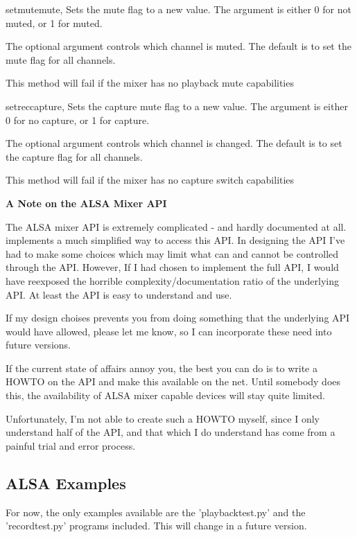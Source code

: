 \begin{methoddesc}[Mixer]{setmute}{mute, }
Sets the mute flag to a new value. The  argument is either 0 for not muted, or 1 for muted.

The optional  argument controls which channel is muted. The default is to set the mute flag
for all channels.

This method will fail if the mixer has no playback mute capabilities
\end{methoddesc}

\begin{methoddesc}[Mixer]{setrec}{capture,}
Sets the capture mute flag to a new value. The  argument is either 0 for no capture, 
or 1 for capture.

The optional  argument controls which channel is changed. The default is to set the capture flag
for all channels.

This method will fail if the mixer has no capture switch capabilities
\end{methoddesc}


\textbf{A Note on the ALSA Mixer API}

The ALSA mixer API is extremely complicated - and hardly documented at all.  implements
a much simplified way to access this API. In designing the API I've had to make some choices which
may limit what can and cannot be controlled through the API. However, If I had chosen to implement the
full API, I would have reexposed the horrible complexity/documentation ratio of the underlying API.
At least the  API is easy to understand and use.

If my design choises prevents you from doing something that the underlying API would have allowed,
please let me know, so I can incorporate these need into future versions.

If the current state of affairs annoy you, the best you can do is to write a HOWTO on the API and
make this available on the net. Until somebody does this, the availability of ALSA mixer capable
devices will stay quite limited.

Unfortunately, I'm not able to create such a HOWTO myself, since I only understand half of the API,
and that which I do understand has come from a painful trial and error process.



\subsection{ALSA Examples \label{pcm-example}}

For now, the only examples available are the 'playbacktest.py' and the 'recordtest.py' programs included.
This will change in a future version.